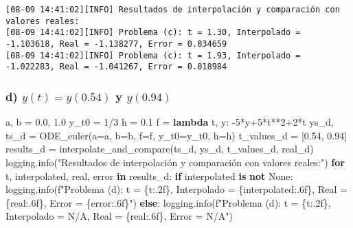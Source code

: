 \documentclass[
  letterpaper,
  DIV=11,
  numbers=noendperiod]{scrartcl}
\newenvironment{Shaded}{\begin{snugshade}}{\end{snugshade}}
\newcommand{\ControlFlowTok}[1]{\textcolor[rgb]{0.00,0.23,0.31}{\textbf{#1}}}
\newcommand{\DecValTok}[1]{\textcolor[rgb]{0.68,0.00,0.00}{#1}}
\newcommand{\FloatTok}[1]{\textcolor[rgb]{0.68,0.00,0.00}{#1}}
\newcommand{\KeywordTok}[1]{\textcolor[rgb]{0.00,0.23,0.31}{\textbf{#1}}}
\newcommand{\NormalTok}[1]{\textcolor[rgb]{0.00,0.23,0.31}{#1}}
\newcommand{\OperatorTok}[1]{\textcolor[rgb]{0.37,0.37,0.37}{#1}}
\newcommand{\SpecialCharTok}[1]{\textcolor[rgb]{0.37,0.37,0.37}{#1}}
\newcommand{\SpecialStringTok}[1]{\textcolor[rgb]{0.13,0.47,0.30}{#1}}
\newcommand{\StringTok}[1]{\textcolor[rgb]{0.13,0.47,0.30}{#1}}
\newcommand{\VariableTok}[1]{\textcolor[rgb]{0.07,0.07,0.07}{#1}}
\begin{document}
\begin{verbatim}
[08-09 14:41:02][INFO] Resultados de interpolación y comparación con valores reales:
[08-09 14:41:02][INFO] Problema (c): t = 1.30, Interpolado = -1.103618, Real = -1.138277, Error = 0.034659
[08-09 14:41:02][INFO] Problema (c): t = 1.93, Interpolado = -1.022283, Real = -1.041267, Error = 0.018984
\end{verbatim}

\subsubsection{\texorpdfstring{d) \(y(t)=y(0.54)\) y
\(y(0.94)\)}{d) y(t)=y(0.54) y y(0.94)}}\label{d-yty0.54-y-y0.94}

\begin{Shaded}
\begin{Highlighting}[]
\NormalTok{a, b }\OperatorTok{=} \FloatTok{0.0}\NormalTok{, }\FloatTok{1.0}
\NormalTok{y\_t0 }\OperatorTok{=} \DecValTok{1}\OperatorTok{/}\DecValTok{3}
\NormalTok{h }\OperatorTok{=} \FloatTok{0.1}
\NormalTok{f }\OperatorTok{=} \KeywordTok{lambda}\NormalTok{ t, y: }\OperatorTok{{-}}\DecValTok{5}\OperatorTok{*}\NormalTok{y}\OperatorTok{+}\DecValTok{5}\OperatorTok{*}\NormalTok{t}\OperatorTok{**}\DecValTok{2}\OperatorTok{+}\DecValTok{2}\OperatorTok{*}\NormalTok{t}
\NormalTok{ys\_d, ts\_d }\OperatorTok{=}\NormalTok{ ODE\_euler(a}\OperatorTok{=}\NormalTok{a, b}\OperatorTok{=}\NormalTok{b, f}\OperatorTok{=}\NormalTok{f, y\_t0}\OperatorTok{=}\NormalTok{y\_t0, h}\OperatorTok{=}\NormalTok{h)}
\NormalTok{t\_values\_d }\OperatorTok{=}\NormalTok{ [}\FloatTok{0.54}\NormalTok{, }\FloatTok{0.94}\NormalTok{]}
\NormalTok{results\_d }\OperatorTok{=}\NormalTok{ interpolate\_and\_compare(ts\_d, ys\_d, t\_values\_d, real\_d)}
\NormalTok{logging.info(}\StringTok{"Resultados de interpolación y comparación con valores reales:"}\NormalTok{)}
\ControlFlowTok{for}\NormalTok{ t, interpolated, real, error }\KeywordTok{in}\NormalTok{ results\_d:}
    \ControlFlowTok{if}\NormalTok{ interpolated }\KeywordTok{is} \KeywordTok{not} \VariableTok{None}\NormalTok{:}
\NormalTok{        logging.info(}\SpecialStringTok{f"Problema (d): t = }\SpecialCharTok{\{}\NormalTok{t}\SpecialCharTok{:.2f\}}\SpecialStringTok{, Interpolado = }\SpecialCharTok{\{}\NormalTok{interpolated}\SpecialCharTok{:.6f\}}\SpecialStringTok{, Real = }\SpecialCharTok{\{}\NormalTok{real}\SpecialCharTok{:.6f\}}\SpecialStringTok{, Error = }\SpecialCharTok{\{}\NormalTok{error}\SpecialCharTok{:.6f\}}\SpecialStringTok{"}\NormalTok{)}
    \ControlFlowTok{else}\NormalTok{:}
\NormalTok{        logging.info(}\SpecialStringTok{f"Problema (d): t = }\SpecialCharTok{\{}\NormalTok{t}\SpecialCharTok{:.2f\}}\SpecialStringTok{, Interpolado = N/A, Real = }\SpecialCharTok{\{}\NormalTok{real}\SpecialCharTok{:.6f\}}\SpecialStringTok{, Error = N/A"}\NormalTok{)}
\end{Highlighting}
\end{Shaded}
\end{document}
